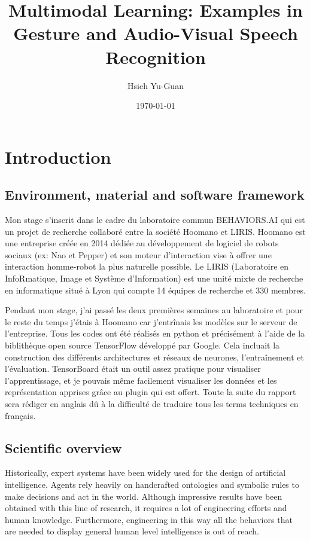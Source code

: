 

\title{Multimodal Learning: Examples in Gesture and Audio-Visual
Speech Recognition\vspace{-0.5em}}
\author{Hsieh Yu-Guan}
\date{\today}
\maketitle

\section{Introduction} \label{section:introduction}

\subsection{Environment, material and software framework}

Mon stage s'inscrit dans le cadre du laboratoire commun BEHAVIORS.AI
qui est un projet de recherche collaboré entre la société Hoomano et LIRIS.
Hoomano est une entreprise créée en 2014 dédiée au développement de
logiciel de robots sociaux (ex: Nao et Pepper) et son moteur d'interaction
vise à offrer une interaction homme-robot la plus naturelle possible.
Le LIRIS (Laboratoire en InfoRmatique, Image et Système d'Information)
est une unité mixte de recherche en informatique situé à Lyon qui compte
14 équipes de recherche et 330 membres.

Pendant mon stage, j'ai passé les deux premières semaines au
laboratoire et pour le reste du temps j'étais à Hoomano car j'entrînais
les modèles sur le serveur de l'entreprise. Tous les codes ont été
réalisés en python et précisément à l'aide de la biblithèque open source
TensorFlow développé par Google. Cela incluait la construction des
différents architectures et réseaux de neurones, l'entraînement et
l'évaluation.
TensorBoard était un outil assez pratique pour visualiser l'apprentissage,
et je pouvais même facilement visualiser les données et les
représentation apprises grâce au plugin qui est offert.
Toute la suite du rapport sera rédiger en anglais dû à la difficulté
de traduire tous les terms techniques en français.

\subsection{Scientific overview}

Historically, expert systems have been widely used for the design
of artificial intelligence. 
Agents rely heavily on handcrafted ontologies and symbolic rules to
make decisions and act in the world.
Although impressive results have been obtained with this line of
research, it requires a lot of engineering efforts and human knowledge.
Furthermore, engineering in this way all the behaviors that are needed
to display general human level intelligence is out of reach.

